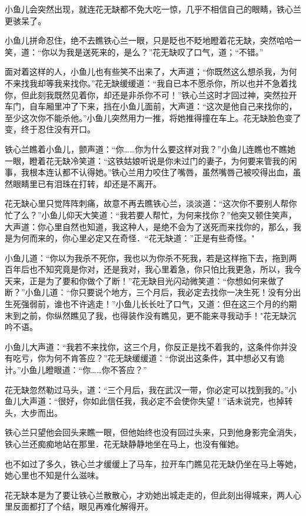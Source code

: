 \documentclass[12pt,oneside]{book}
\begin{document}
小鱼儿会突然出现，就连花无缺都不免大吃一惊，几乎不相信自己的眼睛，铁心兰更骇呆了。

小鱼儿拼命忍住，绝不去瞧铁心兰一眼，只是眨也不眨地瞪着花无缺，突然哈哈一笑，道：``你以为我是送死来的，是么？''花无缺叹了口气，道；``不错。''

面对着这样的人，小鱼儿也有些笑不出来了，大声道；``你既然这么想杀我，为何不来找我却等我来找你。''花无缺缓缓道：``我自已本不愿杀你，所以也并不急着找你，但此刻我既然见着你，却还是非杀你不可！''铁心兰这时才回过神，突然拉开车门，自车厢里冲了下来，挡在小鱼儿面前，大声道：``这次是他自己来找你的，至少这次你不能杀他。''小鱼儿突然用力一推，将她推得撞在车上。花无缺脸色变了变，终于忍住没有开口。

铁心兰瞧着小鱼儿，颤声道：``你\ldots\ldots 你为什么要这样对我？''小鱼儿连瞧也不瞧她一眼，瞪着花无缺冷笑道：``这铁姑娘听说是你未过门的妻子，为何要来管我的闲事，我根本连认都不认得她。''铁心兰用力咬住了嘴唇，虽然嘴唇己被咬得出血，虽然眼睛里已有泪珠在打转，却还是不离开。

花无缺心里只觉阵阵刺痛，故意不再去瞧铁心兰，淡淡道：``这次你不要别人帮你忙了么？''小鱼儿仰天大笑道：``我若要人帮忙，为何来找你？''他突又顿住笑声，大声道：你心里自然也知道，我这种人，是绝不会为了送死而来找你的，那么，我是为何而来的，你心里必定又在奇怪．``花无缺道：''正是有些奇怪。"

小鱼儿道：``你以为我杀不死你，我也以为你杀不死我，若是这样拖下去，拖到两百年后也不知究竟是你对，还是我对，我心里着急，你只怕比我更急，所以，我今天来，正是为了要和你做个了断！''花无缺目光闪动微笑道：``你想如何来做了断？''小鱼儿道：``你只要说个地方，三个月后，我必定去找你一决生死！没有分出生死强弱前，谁也不许逃走！''小鱼儿长长吐了口气，又道：但在这三个月的约期末到之前，你纵然瞧见了我，也得装作没有瞧见，更不能来寻我动手！"花无缺沉吟不语。

小鱼儿大声道：``我若不来找你，这三个月，你反正是找不着我的，这条件你并没有吃亏，你为何不肯答应？''花无缺缓缓道：``你说出这条件，其中想必又有诡计。''小鱼儿瞪眼道：``你\ldots\ldots 你不答应？''

花无缺忽然勒过马头，道：``三个月后，我在武汉一带，你必定可以找到我的。''小鱼儿大声道：``很好，你如此信任我，我必定不会使你失望！''话未说完，也掉转头，大步而出。

铁心兰只望他会回头来瞧一眼，但他始终也没有回过头来，只到他身影完全消失，铁心兰还痴痴地站在那里．花无缺静静地坐在马上，也没有催她。

也不如过了多久，铁心兰才缓缓上了马车，拉开车门瞧见花无缺仍坐在马上等她，她心里也不知是什么滋味。

花无缺本是为了要让铁心兰散散心，才劝她出城走走的，但此刻出得城来，两人心里反面都打了个结，眼见再难化解得开。
\end{document}
